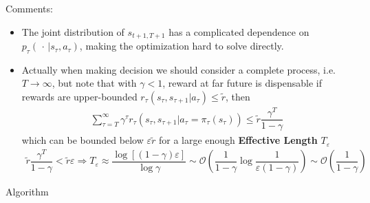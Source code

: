 Comments:
\begin{itemize}[topsep=2pt,itemsep=0pt]
    \item The joint distribution of $ s_{t+1,T+1} $ has a complicated dependence on $ p_\tau(\, \cdot \, |s_\tau,a_\tau) $, making the optimization hard to solve directly.
    \item Actually when making decision we should consider a complete process, i.e. $ T\to \infty $, but note that with $ \gamma <1 $, reward at far future is dispensable if rewards are upper-bounded $ r_\tau(s_\tau,s_{\tau+1}|a_\tau)\leq \tilde{r} $, then
    \begin{align}
        \sum_{\tau = T }^\infty\gamma ^{\tau}r_\tau\left(s_\tau,s_{\tau+1}|a_\tau=\pi_\tau(s_\tau)\right) \leq \tilde{r}\dfrac{\gamma ^T}{1-\gamma }
    \end{align}
    which can be bounded below $\varepsilon  \tilde{r} $ for a large enough \textbf{Effective Length}  $ T_\varepsilon  $
    \begin{align}
        \tilde{r}\dfrac{\gamma ^T}{1-\gamma }<\tilde{r}\varepsilon \Rightarrow T_\varepsilon \approx \dfrac{\log[(1-\gamma )\varepsilon ]}{\log \gamma }\sim \mathcal{O}\left( \dfrac{1}{1-\gamma }\log\dfrac{1}{\varepsilon (1-\gamma )} \right)\sim \mathcal{O}(\dfrac{1}{1-\gamma })
    \end{align}
\end{itemize}

\begin{point}
    Algorithm
\end{point}

